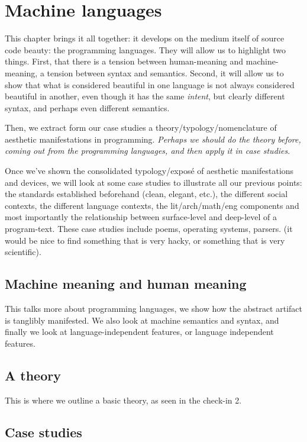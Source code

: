 \chapter{Machine languages}

This chapter brings it all together: it develops on the medium itself of source code beauty: the programming languages. They will allow us to highlight two things. First, that there is a tension between human-meaning and machine-meaning, a tension between syntax and semantics. Second, it will allow us to show that what is considered beautiful in one language is not always considered beautiful in another, even though it has the same \emph{intent}, but clearly different syntax, and perhaps even different semantics.

Then, we extract form our case studies a theory/typology/nomenclature of aesthetic manifestations in programming. \emph{Perhaps we should do the theory before, coming out from the programming languages, and then apply it in case studies}.

Once we've shown the consolidated typology/exposé of aesthetic manifestations and devices, we will look at some case studies to illustrate all our previous points: the standards established beforehand (clean, elegant, etc.), the different social contexts, the different language contexts, the lit/arch/math/eng components and most importantly the relationship between surface-level and deep-level of a program-text. These case studies include poems, operating systems, parsers. (it would be nice to find something that is very hacky, or something that is very scientific).

\section{Machine meaning and human meaning}

This talks more about programming languages, we show how the abstract artifact is tanglibly manifested. We also look at machine semantics and syntax, and finally we look at language-independent features, or language independent features.

\section{A theory}

This is where we outline a basic theory, as seen in the check-in 2.

\section{Case studies}

